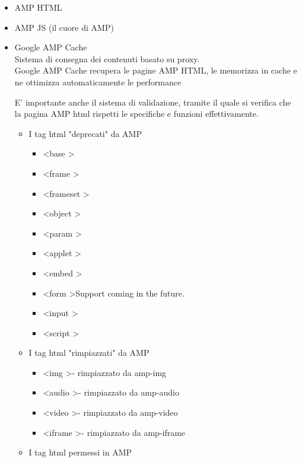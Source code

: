 \documentclass{article}
\begin{document}
\begin{itemize}
    \item AMP HTML
    \item AMP JS (il cuore di AMP)
    \item Google AMP Cache\\
    Sistema di consegna dei contenuti basato su proxy.\\
    Google AMP Cache recupera le pagine AMP HTML, le memorizza in cache e ne ottimizza automaticamente le performance
    
    E' importante anche il sistema di validazione, tramite il quale si verifica che la pagina AMP html rispetti le specifiche e funzioni effettivamente.
    \begin{itemize}
        \item I tag html "deprecati" da AMP
        \begin{itemize}
            \item \textless base \textgreater
            \item \textless frame \textgreater
            \item \textless frameset \textgreater
            \item \textless object \textgreater
            \item \textless param \textgreater
            \item \textless applet \textgreater
            \item \textless embed \textgreater
            \item \textless form \textgreater Support coming in the future.
            \item \textless input \textgreater
            \item \textless script \textgreater
        \end{itemize}
        \item I tag html "rimpiazzati" da AMP
        \begin{itemize}
            \item \textless img \textgreater - rimpiazzato da amp-img
            \item \textless audio \textgreater - rimpiazzato da amp-audio
            \item \textless video \textgreater - rimpiazzato da amp-video
            \item \textless iframe \textgreater - rimpiazzato da amp-iframe
        \end{itemize}
        \item I tag html permessi in  AMP

\end{itemize}
\end{itemize}
\end{document}
